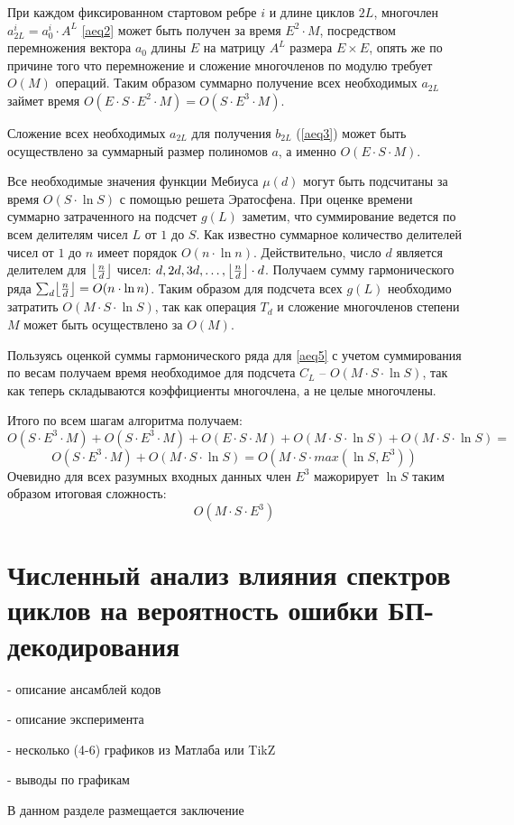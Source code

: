 \documentclass[specification,annotation,times]{itmo-student-thesis}
\DeclarePairedDelimiter\floor{\lfloor}{\rfloor}
\begin{document}
При каждом фиксированном стартовом ребре $i$ и длине циклов $2L$, многочлен $a_{2L}^i=a_0^i \cdot A^L$ \ref{aeq2}
может быть получен за время $E^2 \cdot M$, посредством перемножения вектора $a_0$ длины $E$ на матрицу
$A^L$ размера $E \times E$, опять же по причине того что перемножение и сложение многочленов по модулю 
требует $O(M)$ операций. Таким образом суммарно получение всех необходимых $a_{2L}$ займет
 время $O(E \cdot S \cdot E^2 \cdot M) = O(S \cdot E^3 \cdot M)$.

Сложение всех необходимых $a_{2L}$ для получения $b_{2L}$ (\ref{aeq3}) может быть осуществлено за суммарный размер 
полиномов $a$, а именно $O(E \cdot S \cdot M)$.

Все необходимые значения функции Мебиуса $\mu(d)$ могут быть подсчитаны за время $O(S \cdot \ln S)$ с
помощью решета Эратосфена. При оценке времени суммарно затраченного на подсчет $g(L)$ заметим,
 что суммирование ведется по всем делителям чисел $L$ от $1$ до $S$. Как известно суммарное количество
делителей чисел от $1$ до $n$ имеет порядок $O(n \cdot \ln n)$. Действительно, число $d$ является 
делителем для $\floor*{\frac{n}{d}}$ чисел: $d, 2d, 3d, \ldots, \floor*{\frac{n}{d}} \cdot d$. Получаем сумму гармонического ряда
 $\sum_d \floor*{\frac{n}{d}} = O(n \cdot \ln n)$. Таким образом для подсчета всех $g(L)$ необходимо затратить $O(M \cdot S \cdot \ln S)$,
так как операция $T_d$ и сложение многочленов степени $M$ может быть осуществлено за $O(M)$.

Пользуясь оценкой суммы гармонического ряда для \ref{aeq5} с учетом суммирования по весам получаем
время необходимое для подсчета $C_L$ -- $O(M \cdot S \cdot \ln S)$, так как теперь складываются 
коэффициенты многочлена, а не целые многочлены.

Итого по всем шагам алгоритма получаем:
\[
O(S \cdot E^3 \cdot M) + O(S \cdot E^3 \cdot M) + 
O(E \cdot S \cdot M) + O(M \cdot S \cdot \ln S) + O(M \cdot S \cdot \ln S)= 
\]
\[
O(S \cdot E^3 \cdot M) + O(M \cdot S \cdot \ln S) = O(M \cdot S \cdot max(\ln S, E^3))
\]
Очевидно для всех разумных входных данных член $E^3$ мажорирует $\ln S$ таким образом итоговая сложность:
\[
  O(M \cdot S \cdot E^3)
\]
\chapter{Численный анализ влияния спектров циклов на вероятность ошибки 
БП-декодирования} 

- описание ансамблей кодов

- описание эксперимента

- несколько (4-6) графиков из Матлаба или  TikZ

- выводы по графикам



\startconclusionpage

В данном разделе размещается заключение

\printmainbibliography
\end{document}
